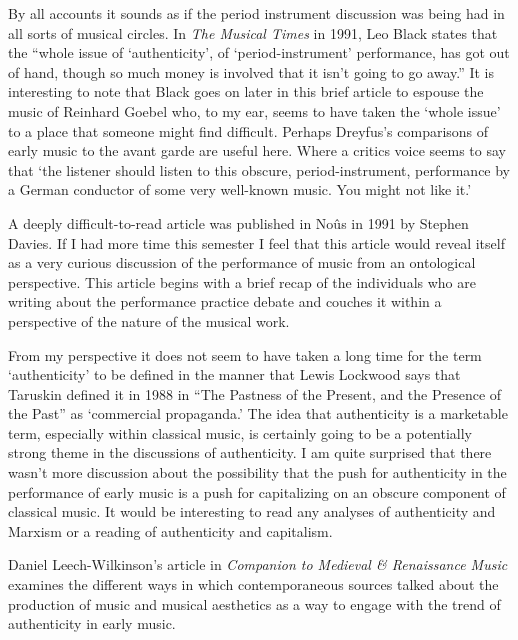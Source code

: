 \documentclass[12pt]{article}
\begin{document}
By all accounts it sounds as if the period instrument discussion was
being had in all sorts of musical circles. In \emph{The Musical Times}
in 1991, Leo Black states that the ``whole issue of `authenticity', of
`period-instrument' performance, has got out of hand, though so much
money is involved that it isn't going to go
away.''\autocite[64]{black1991} It is interesting to note that Black
goes on later in this brief article to espouse the music of Reinhard
Goebel who, to my ear, seems to have taken the `whole issue' to a
place that someone might find difficult. Perhaps Dreyfus's comparisons
of early music to the avant garde are useful here. Where a critics
voice seems to say that `the listener should listen to this obscure,
period-instrument, performance by a German conductor of some very
well-known music. You might not like it.'

A deeply difficult-to-read article was published in Noûs in 1991 by
Stephen Davies.\autocite{davies1991} If I had more time this semester
I feel that this article would reveal itself as a very curious
discussion of the performance of music from an ontological
perspective. This article begins with a brief recap of the individuals
who are writing about the performance practice debate and couches it
within a perspective of the nature of the musical work.

\nocite{sherr1991}

From my perspective it does not seem to have taken a long time for the
term `authenticity' to be defined in the manner that Lewis Lockwood
says that Taruskin defined it in 1988 in ``The Pastness of the
Present, and the Presence of the Past'' as `commercial
propaganda.'\autocites[137]{taruskin1988}[as quoted
in:][]{lockwood1991} The idea that authenticity is a marketable term,
especially within classical music, is certainly going to be a
potentially strong theme in the discussions of authenticity. I am
quite surprised that there wasn't more discussion about the
possibility that the push for authenticity in the performance of early
music is a push for capitalizing on an obscure component of classical
music. It would be interesting to read any analyses of authenticity
and Marxism or a reading of authenticity and capitalism.

Daniel Leech-Wilkinson's article in \emph{Companion to Medieval \&
  Renaissance Music} examines the different ways in which
contemporaneous sources talked about the production of music and
musical aesthetics as a way to engage with the trend of authenticity
in early music.\autocite{leech1992}
\end{document}
